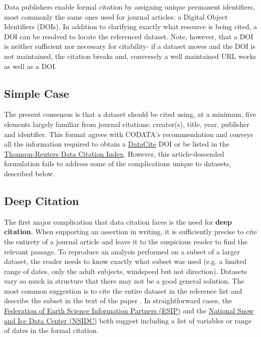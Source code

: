 \documentclass[10pt,twocolumn]{article}
\begin{document}
Data publishers enable formal citation by assigning unique permanent identifiers, most commonly the same ones used for journal articles: a Digital Object Identifiers (DOIs).
In addition to clarifying exactly what resource is being cited, a DOI can be resolved to locate the referenced dataset.
Note, however, that a DOI is neither sufficient nor necessary for citability- if a dataset moves and the DOI is not maintained, the citation breaks and, conversely a well maintained URL works as well as a DOI.


\subsection*{Simple Case}\label{simple-case}

The present consensus is that a dataset should be cited using, at a minimum, five elements largely familiar from journal citations: creator(s), title, year, publisher and identifier.
This format agrees with CODATA's recommendation\cite{codata-icsti_task_group_on_data_citation_standards_and_practices_out_2013} and conveys all the information required to obtain a \href{http://www.datacite.org/}{DataCite} DOI\cite{datacite_datacite_2013} or be listed in the \href{http://thomsonreuters.com/data-citation-index/}{Thomson-Reuters Data Citation Index}.
However, this article-descended formulation fails to address some of the complications unique to datasets, described below.

\subsection*{Deep Citation}\label{deep-citation}

The first major complication that data citation faces is the need for \textbf{deep citation}.
When supporting an assertion in writing, it is sufficiently precise to cite the entirety of a journal article and leave it to the suspicious reader to find the relevant passage.
To reproduce an analysis performed on a subset of a larger dataset, the reader needs to know exactly what subset was used (e.g. a limited range of dates, only the adult subjects, windspeed but not direction).
Datasets vary so much in structure that there may not be a good general solution.
The most common suggestion is to cite the entire dataset in the reference list and describe the subset in the text of the paper \cite{altman_a_2007}.
In straightforward cases, the \href{http://wiki.esipfed.org/index.php/Interagency_Data_Stewardship/Citations/provider_guidelines#Subset_Used}{Federation of Earth Science Information Partners (ESIP)} and the \href{http://nsidc.org/about/use_copyright.html}{National Snow and Ice Data Center (NSIDC)} both suggest including a list of variables or range of dates in the formal citation.
\end{document}
